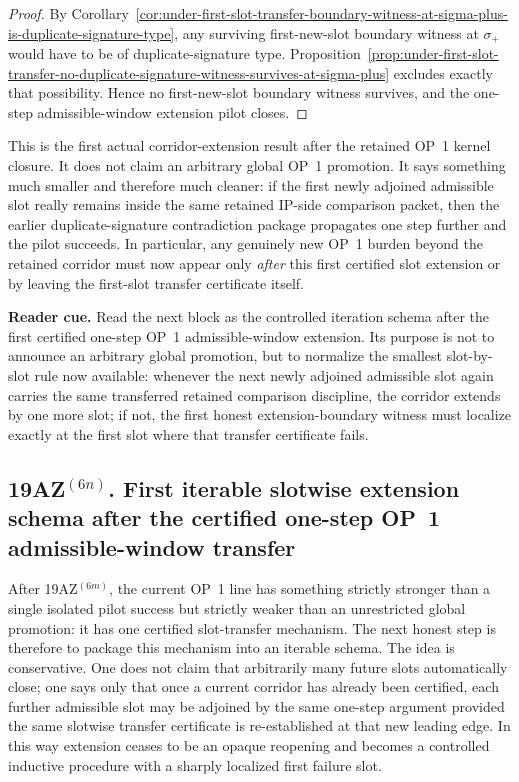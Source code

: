 \begin{proof}
By Corollary~\ref{cor:under-first-slot-transfer-boundary-witness-at-sigma-plus-is-duplicate-signature-type}, any surviving first-new-slot boundary witness at $\sigma_{+}$ would have to be of duplicate-signature type. Proposition~\ref{prop:under-first-slot-transfer-no-duplicate-signature-witness-survives-at-sigma-plus} excludes exactly that possibility. Hence no first-new-slot boundary witness survives, and the one-step admissible-window extension pilot closes.
\end{proof}

\begin{remark}
\label{rem:what-first-certified-one-step-op1-extension-buys}
This is the first actual corridor-extension result after the retained OP~1 kernel closure. It does not claim an arbitrary global OP~1 promotion. It says something much smaller and therefore much cleaner: if the first newly adjoined admissible slot really remains inside the same retained IP-side comparison packet, then the earlier duplicate-signature contradiction package propagates one step further and the pilot succeeds. In particular, any genuinely new OP~1 burden beyond the retained corridor must now appear only \emph{after} this first certified slot extension or by leaving the first-slot transfer certificate itself.
\end{remark}


\noindent\textbf{Reader cue.} Read the next block as the controlled iteration schema after the first certified one-step OP~1 admissible-window extension. Its purpose is not to announce an arbitrary global promotion, but to normalize the smallest slot-by-slot rule now available: whenever the next newly adjoined admissible slot again carries the same transferred retained comparison discipline, the corridor extends by one more slot; if not, the first honest extension-boundary witness must localize exactly at the first slot where that transfer certificate fails.

\subsection*{19AZ$^{(6n)}$. First iterable slotwise extension schema after the certified one-step OP~1 admissible-window transfer}
\label{sec:first-iterable-slotwise-extension-schema-after-certified-one-step-op1-admissible-window-transfer}
After 19AZ$^{(6m)}$, the current OP~1 line has something strictly stronger than a single isolated pilot success but strictly weaker than an unrestricted global promotion: it has one certified slot-transfer mechanism. The next honest step is therefore to package this mechanism into an iterable schema. The idea is conservative. One does not claim that arbitrarily many future slots automatically close; one says only that once a current corridor has already been certified, each further admissible slot may be adjoined by the same one-step argument provided the same slotwise transfer certificate is re-established at that new leading edge. In this way extension ceases to be an opaque reopening and becomes a controlled inductive procedure with a sharply localized first failure slot.

